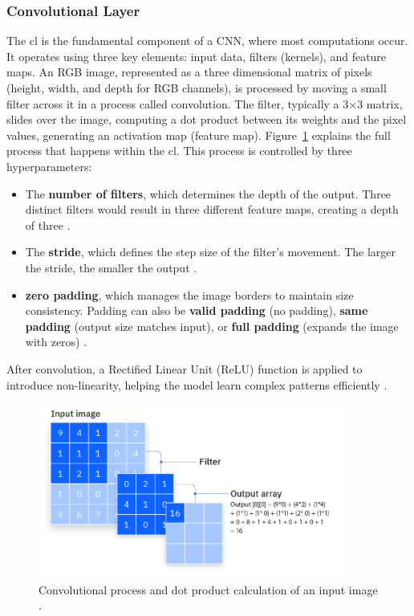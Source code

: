\subsubsection{Convolutional Layer}
The \gls{cl} is the fundamental component of a CNN, where most computations occur. It operates using three key elements: input data, filters (kernels), and feature maps. An RGB image, represented as a three dimensional matrix of pixels (height, width, and depth for RGB channels), is processed by moving a small filter across it in a process called convolution. The filter, typically a 3×3 matrix, slides over the image, computing a dot product between its weights and the pixel values, generating an activation map (feature map). Figure~\ref{cnn_cl} explains the full process that happens within the \gls{cl}. This process is controlled by three hyperparameters:
\begin{itemize}
    \item The \textbf{number of filters}, which determines the depth of the output. Three distinct filters would result in three different feature maps, creating a depth of three \cite{ibm_cnn}.
    \item The \textbf{stride}, which defines the step size of the filter's movement. The larger the stride, the smaller the output \cite{ibm_cnn}.
    \item \textbf{zero padding}, which manages the image borders to maintain size consistency. Padding can also be \textbf{valid padding} (no padding), \textbf{same padding} (output size matches input), or \textbf{full padding} (expands the image with zeros) \cite{ibm_cnn}.
\end{itemize}   
After convolution, a Rectified Linear Unit (ReLU) function is applied to introduce non-linearity, helping the model learn complex patterns efficiently \cite{ibm_cnn}.

\begin{figure}[ht]
    \centering
    \includegraphics[width=0.9\textwidth]{Figures/CNN_CL.PNG} 
    \caption{Convolutional process and dot product calculation of an input image \cite{ibm_cnn}.}
    \label{cnn_cl}
\end{figure}

